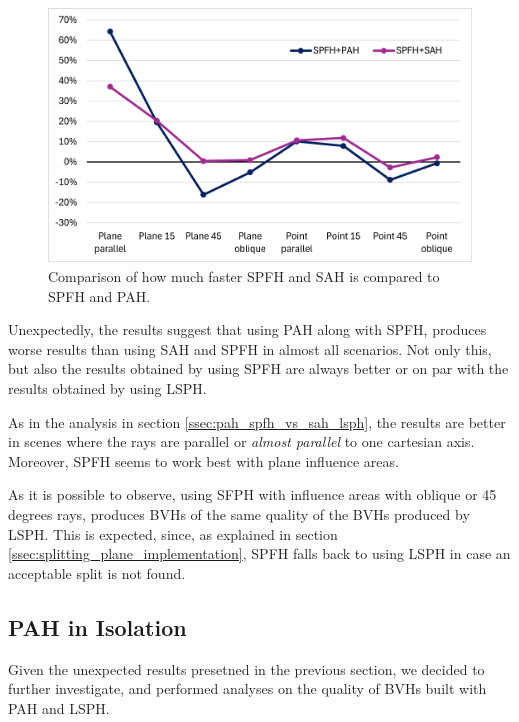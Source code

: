 \documentclass{PoliMi_MasterThesis}
\begin{document}
\begin{figure}[H] 
	\includegraphics[width=\textwidth]{Images/spfh_isolation.png}
	\caption{Comparison of how much faster SPFH and SAH is compared to SPFH and PAH.}
	\label{fig:spfh_isolation}
\end{figure}

Unexpectedly, the results suggest that using PAH along with SPFH, produces worse results than using SAH and SPFH in almost all scenarios. Not only this, but also the results obtained by using SPFH are always better or on par with the results obtained by using LSPH.

As in the analysis in section \ref{ssec:pah_spfh_vs_sah_lsph}, the results are better in scenes where the rays are parallel or \textit{almost parallel} to one cartesian axis. Moreover, SPFH seems to work best with plane influence areas.

As it is possible to observe, using SFPH with influence areas with oblique or 45 degrees rays, produces BVHs of the same quality of the BVHs produced by LSPH. This is expected, since, as explained in section \ref{ssec:splitting_plane_implementation}, SPFH falls back to using LSPH in case an acceptable split is not found. 

\subsection{PAH in Isolation} \label{ssec:pah_isolation}
Given the unexpected results presetned in the previous section, we decided to further investigate, and performed analyses on the quality of BVHs built with PAH and LSPH.
\end{document}
